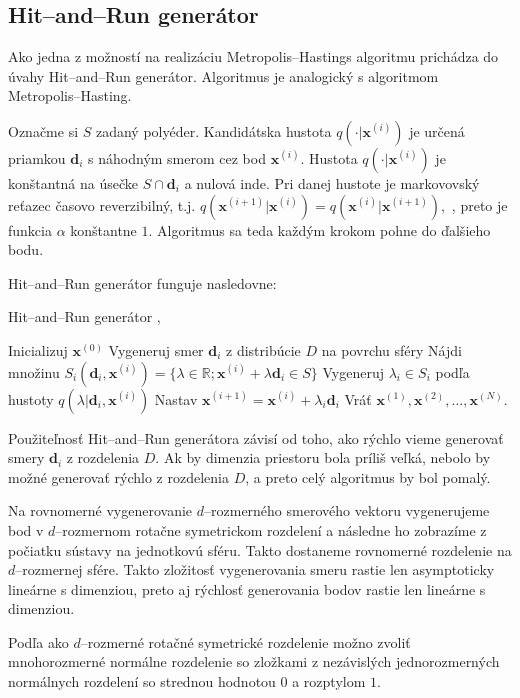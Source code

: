 \subsection{Hit--and--Run generátor}

Ako jedna z možností na realizáciu Metropolis--Hastings algoritmu prichádza do úvahy Hit--and--Run generátor. Algoritmus je analogický s algoritmom Metropolis--Hasting.

Označme si $S$ zadaný polyéder. Kandidátska hustota $q(\cdot|\mathbf x^{(i)})$ je určená priamkou $\mathbf d_i$ s náhodným smerom cez bod $\mathbf x^{(i)}$. Hustota $q(\cdot|\mathbf x^{(i)})$ je konštantná na úsečke $S \cap \mathbf d_i$ a nulová inde. Pri danej hustote je markovovský reťazec časovo reverzibilný, t.j. $q(\mathbf x^{(i+1)}|\mathbf x^{(i)})=q(\mathbf x^{(i)}|\mathbf x^{(i+1)}),$ \cite{hit-and-run_chen}, preto je funkcia $\alpha$ konštantne $1$. Algoritmus sa teda každým krokom pohne do ďalšieho bodu.

Hit--and--Run generátor funguje nasledovne:

\begin{algorithm}[H]
	\caption{Hit--and--Run generátor \cite{hit-and-run_chen},\cite{zhluky_lukacek}}
	\label{hit--and--run}
	\begin{algorithmic}[1]
		\State Inicializuj $\mathbf x^{(0)}$
			\State Vygeneruj smer $\mathbf d_i$ z distribúcie $D$ na povrchu sféry
			\State Nájdi množinu $S_i(\mathbf d_i,\mathbf x^{(i)})=\{\lambda \in \mathbb{R}; \mathbf x^{(i)} + \lambda \mathbf d_i \in S \} $
			\State Vygeneruj $\lambda_i \in S_i$ podľa hustoty $q(\lambda | \mathbf d_i, \mathbf x^{(i)})$
			\State Nastav $\mathbf x^{(i+1)}=\mathbf x^{(i)}+\lambda_i \mathbf d_i$
		\EndFor
		\State Vráť $\mathbf x^{(1)},\mathbf x^{(2)},\dots,\mathbf x^{(N)}$.
	\end{algorithmic}
\end{algorithm}

Použiteľnosť Hit--and--Run generátora závisí od toho, ako rýchlo vieme generovať smery $\mathbf d_i$ z rozdelenia $D$. Ak by dimenzia priestoru bola príliš veľká, nebolo by možné generovať rýchlo z rozdelenia $D$, a preto celý algoritmus by bol pomalý. 

Na rovnomerné vygenerovanie $d$--rozmerného smerového vektoru vygenerujeme bod v $d$--rozmernom rotačne symetrickom rozdelení a následne ho zobrazíme z počiatku sústavy na jednotkovú sféru. Takto dostaneme rovnomerné rozdelenie na $d$--rozmernej sfére. Takto zložitosť vygenerovania smeru rastie len asymptoticky lineárne s dimenziou, preto aj rýchlosť generovania bodov rastie len lineárne s dimenziou.

Podľa \cite{spheres_harman} ako $d$--rozmerné rotačné symetrické rozdelenie možno zvoliť mnohorozmerné normálne rozdelenie so zložkami z nezávislých jednorozmerných normálnych rozdelení so strednou hodnotou $0$ a rozptylom $1$.
